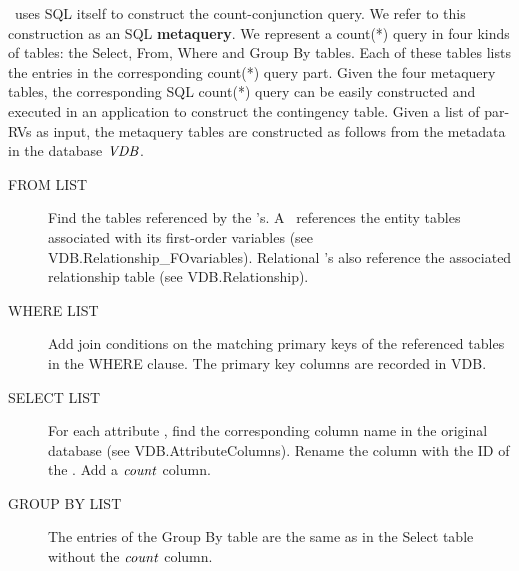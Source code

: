 \FB\ uses SQL itself to construct the count-conjunction query. We refer to this construction as an SQL \textbf{metaquery}. We represent a count(*) query in 
four kinds of tables: the Select, From, Where and Group By tables. Each of these tables lists the entries in the corresponding count(*) query part.
%
Given the four metaquery tables, the corresponding SQL count(*) query can be easily constructed and executed in an application to construct the contingency table.
Given a list of par-RVs as input, the metaquery tables are constructed as follows
from the metadata in the database ${\it VDB }$.  




\begin{description}
\item[FROM LIST] Find the tables referenced by the \RRV's. A \RRV ~references the entity tables associated with its first-order variables (see VDB.Relationship\_FOvariables). Relational \RRV's also reference the associated relationship table (see VDB.Relationship). 
\item[WHERE LIST] Add join conditions on the matching primary keys of the referenced tables in the WHERE clause. The primary key columns are recorded in VDB. 
\item[SELECT LIST] For each attribute \RRV, find the corresponding column name in the original database (see VDB.AttributeColumns). Rename the column with the ID of the \RRV. Add a $\it{count}$ column.
\item[GROUP BY LIST] The entries of the Group By table are the same as in the Select table without the $\it{count}$ column.
\end{description}


